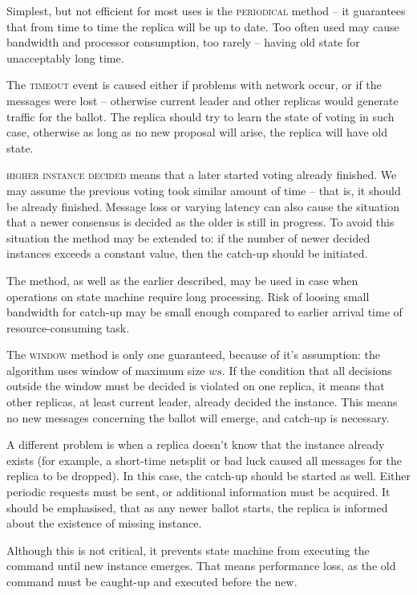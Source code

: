 Simplest, but not efficient for most uses is the \textsc{periodical} method -- it guarantees that from time to time the replica will be up to date.
Too often used may cause bandwidth and processor consumption, too rarely -- having old state for unacceptably long time.

The \textsc{timeout} event is caused either if problems with network occur, or if the \accept messages were lost -- otherwise current leader and other replicas would generate traffic for the ballot. The replica should try to learn the state of voting in such case, otherwise as long as no new proposal will arise, the replica will have old state.

\textsc{higher instance decided} means that a later started voting already finished. We may assume the previous voting took similar amount of time -- that is, it should be already finished. Message loss or varying latency can also cause the situation that a newer consensus is decided as the older is still in progress. To avoid this situation the method may be extended to: if the number of newer decided instances exceeds a constant value, then the catch-up should be initiated.

The method, as well as the earlier described, may be used in case when operations on state machine require long processing. Risk of loosing small bandwidth for catch-up may be small enough compared to earlier arrival time of resource-consuming task.

The \textsc{window} method is only one guaranteed, because of it's assumption: the algorithm uses window of maximum size $ws$. If the condition that all decisions outside the window must be decided is violated on one replica, it means that other replicas, at least current leader, already decided the instance. This means no new messages concerning the ballot will emerge, and catch-up is necessary.

A different problem is when a replica doesn't know that the instance already exists (for example, a short-time netsplit or bad luck caused all messages for the replica to be dropped). In this case, the catch-up should be started as well. 
Either periodic requests must be sent, or additional information must be acquired. It should be emphasised, that as any newer ballot starts, the replica is informed about the existence of missing instance. 

Although this is not critical, it prevents state machine from executing the command until new instance emerges. That means performance loss, as the old command must be caught-up and executed before the new.


